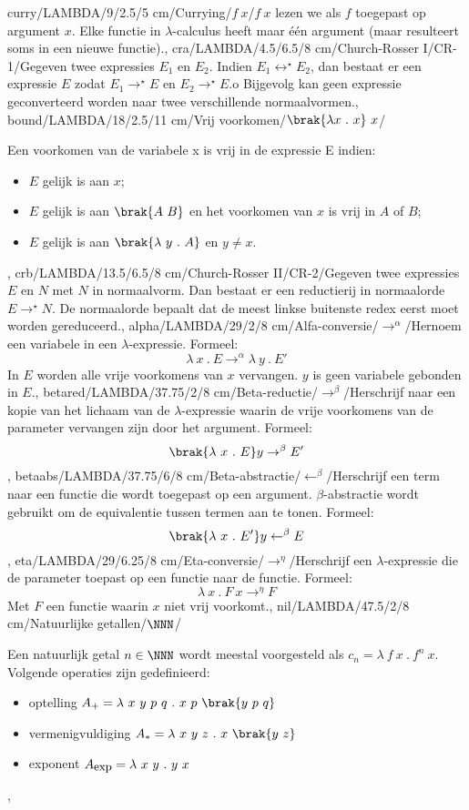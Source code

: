 curry/LAMBDA/9/2.5/5 cm/Currying/$f\ x$/{$f\ x$ lezen we als $f$ toegepast op argument $x$. Elke functie in $\lambda$-calculus heeft maar \'e\'en argument (maar resulteert soms in een nieuwe functie).},
cra/LAMBDA/4.5/6.5/8 cm/Church-Rosser I/CR-1/{Gegeven twee expressies $E_1$ en $E_2$. Indien $E_1\leftrightarrow^{\star}E_2$, dan bestaat er een expressie $E$ zodat $E_1\rightarrow^{\star}E$ en $E_2\rightarrow^{\star}E$.o Bijgevolg kan geen expressie geconverteerd worden naar twee verschillende normaalvormen.},
bound/LAMBDA/18/2.5/11 cm/Vrij voorkomen/$\brak{\lambda x\ .\ x}\ x$/{Een voorkomen van de variabele x is vrij in de expressie E indien:
\begin{itemize}\item $E$ gelijk is aan $x$;\item $E$ gelijk is aan $\brak{A\ B}$ en het voorkomen van $x$ is vrij in $A$ of $B$;\item $E$ gelijk is aan $\brak{\lambda\ y\ .\ A}$ en $y\neq x$.\end{itemize}},
crb/LAMBDA/13.5/6.5/8 cm/Church-Rosser II/CR-2/{Gegeven twee expressies $E$ en $N$ met $N$ in normaalvorm. Dan bestaat er een reductierij in normaalorde $E\rightarrow^{ \star}N$. De normaalorde bepaalt dat de meest linkse buitenste redex eerst moet worden gereduceerd.},
alpha/LAMBDA/29/2/8 cm/Alfa-conversie/$\rightarrow^{\alpha}$/{Hernoem een variabele in een $\lambda$-expressie. Formeel:\[\lambda\ x\ .\ E\rightarrow^{\alpha}\lambda\ y\ .\ E'\] In $E$ worden alle vrije voorkomens van $x$ vervangen. $y$ is geen variabele gebonden in $E$.},
betared/LAMBDA/37.75/2/8 cm/Beta-reductie/$\rightarrow^{\beta}$/{Herschrijf naar een kopie van het lichaam van de $\lambda$-expressie waarin de vrije voorkomens van de parameter vervangen zijn door het argument. Formeel:\[\brak{\lambda\ x\ .\ E} y\rightarrow^{\beta}E'\]},
betaabs/LAMBDA/37.75/6/8 cm/Beta-abstractie/$\leftarrow^{\beta}$/{Herschrijf een term naar een functie die wordt toegepast op een argument. $\beta$-abstractie wordt gebruikt om de equivalentie tussen termen aan te tonen. Formeel:\[\brak{\lambda\ x\ .\ E'} y\leftarrow^{\beta}E\]},
eta/LAMBDA/29/6.25/8 cm/Eta-conversie/$\rightarrow^{\eta}$/{Herschrijf een $\lambda$-expressie die de parameter toepast op een functie naar de functie. Formeel:\[\lambda\ x\ .\ F\ x\rightarrow^{\eta}F\]Met $F$ een functie waarin $x$ niet vrij voorkomt.},
nil/LAMBDA/47.5/2/8 cm/Natuurlijke getallen/$\NNN$/{Een natuurlijk getal $n\in\NNN$ wordt meestal voorgesteld als $c_n=\lambda\ f\ x\ .\ f^n\ x$. Volgende operaties zijn gedefinieerd:\begin{itemize}\item optelling $A_{+}=\lambda\ x\ y\ p\ q\ .\ x\ p\ \brak{y\ p\ q}$\item vermenigvuldiging $A_{*}=\lambda\ x\ y\ z\ .\ x\ \brak{y\ z}$\item exponent $A_{\mbox{\small exp}}=\lambda\ x\ y\ .\ y\ x$\end{itemize}},
